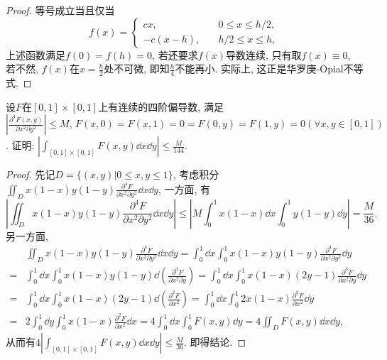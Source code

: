 \begin{quizb}
\begin{proof}
等号成立当且仅当\[f(x)=\begin{cases}
cx,\quad& 0\leqslant x\leqslant h/2,\\
-c(x-h),\quad& h/2\leqslant x\leqslant h,
\end{cases}\]上述函数满足\(f(0)=f(h)=0\), 若还要求\(f(x)\)导数连续, 只有取\(f(x)\equiv 0\), 若不然, \(f(x)\)在\(x=\frac{h}{2}\)处不可微, 即知\(\frac{h}{4}\)不能再小. 实际上, 这正是华罗庚-Opial不等式.
\end{proof}
\woe 设\(F\)在\([0,1]\times [0,1]\)上有连续的四阶偏导数, 满足\(\left|\frac{\partial^4F(x,y)}{\partial x^2\partial y^2}\right|\leqslant M,\,F(x,0)=F(x,1)=0=F(0,y)=F(1,y)=0(\forall x,y\in[0,1])\). 证明: \(\left|\int_{[0,1]\times [0,1]}F(x,y)\dd x\dd y\right|\leqslant\frac{M}{144}\).
\begin{proof}
先记\(D=\{(x,y)\big|0\leqslant x,y\leqslant 1\}\), 考虑积分\(\iint_{D}x(1-x)y(1-y)\frac{\partial^4F}{\partial x^2\partial y^2}\dd x\dd y\), 一方面, 有\[\left|\iint_{D}x(1-x)y(1-y)\frac{\partial^4F}{\partial x^2\partial y^2}\dd x\dd y\right|\leqslant\left|M\int_{0}^{1}x(1-x)\dd x\int_{0}^{1}y(1-y)\dd y\right|=\frac{M}{36}.\]另一方面,\[\begin{split}
&\iint_{D}x(1-x)y(1-y)\frac{\partial^4F}{\partial x^2\partial y^2}\dd x\dd y=\int_{0}^{1}\dd x\int_{0}^{1}x(1-x)y(1-y)\frac{\partial^4F}{\partial x^2\partial y^2}\dd y\\=&\int_{0}^{1}\dd x\int_{0}^{1}x(1-x)y(1-y)\dd\left(\frac{\partial^3F}{\partial x^2\partial y}\right)=\int_{0}^{1}\dd x\int_{0}^{1}x(1-x)(2y-1)\frac{\partial^3F}{\partial x^2\partial y}\dd y\\=&\int_{0}^{1}\dd x\int_{0}^{1}x(1-x)(2y-1)\dd\left(\frac{\partial^2F}{\partial x^2}\right)=\int_{0}^{1}\dd x\int_{0}^{1}2x(1-x)\frac{\partial^2F}{\partial x^2}\dd y\\=&2\int_{0}^{1}\dd y\int_{0}^{1}x(1-x)\frac{\partial^2F}{\partial x^2}\dd x=4\int_{0}^{1}\dd x\int_{0}^{1}F(x,y)\dd y=4\iint_{D}F(x,y)\dd x\dd y,
\end{split}\]从而有\(4\left|\int_{[0,1]\times [0,1]}F(x,y)\dd x\dd y\right|\leqslant\frac{M}{36}\). 即得结论.
\end{proof}
\end{quizb}
